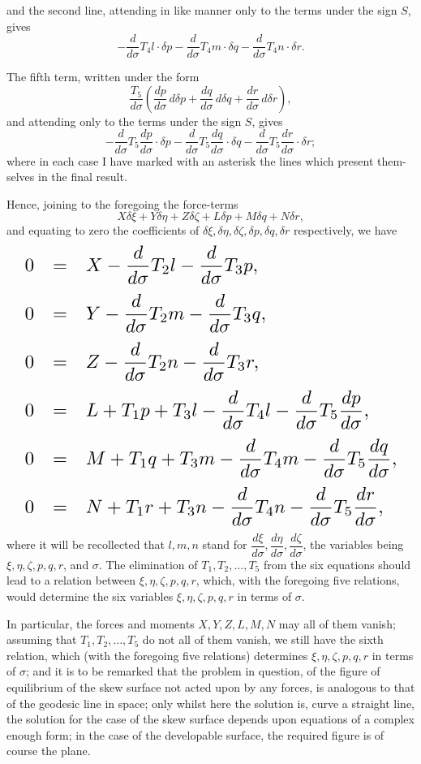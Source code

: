 \documentclass[11pt]{article}
\begin{document}
and the second line, attending in like manner only to the terms under the sign $S$,
gives
\[
-\frac{d}{d\sigma}T_4 l\cdot\delta p - \frac{d}{d\sigma}T_4 m\cdot\delta q - \frac{d}{d\sigma}T_4 n\cdot\delta r. \tag{*}
\]

The fifth term, written under the form
\[
\frac{T_5}{d\sigma}\left(\frac{dp}{d\sigma}\,d\delta p + \frac{dq}{d\sigma}\,d\delta q + \frac{dr}{d\sigma}\,d\delta r\right),
\]
and attending only to the terms under the sign $S$, gives
\[
-\frac{d}{d\sigma}T_5\frac{dp}{d\sigma}\cdot\delta p - \frac{d}{d\sigma}T_5\frac{dq}{d\sigma}\cdot\delta q - \frac{d}{d\sigma}T_5\frac{dr}{d\sigma}\cdot\delta r; \tag{*}
\]
where in each case I have marked with an asterisk the lines which present them-selves
in the final result.

Hence, joining to the foregoing the force-terms
\[
X\delta\xi + Y\delta\eta + Z\delta\zeta + L\delta p + M\delta q + N\delta r, \tag{*}
\]
and equating to zero the coefficients of $\delta\xi, \delta\eta, \delta\zeta, \delta p, \delta q, \delta r$ respectively, we have
\[
\resizebox{\textwidth}{!}{$\displaystyle
\begin{array}{rcl}
0 &=& X - \dfrac{d}{d\sigma}T_2 l - \dfrac{d}{d\sigma}T_3 p, \\[2ex]
0 &=& Y - \dfrac{d}{d\sigma}T_2 m - \dfrac{d}{d\sigma}T_3 q, \\[2ex]
0 &=& Z - \dfrac{d}{d\sigma}T_2 n - \dfrac{d}{d\sigma}T_3 r, \\[2ex]
0 &=& L + T_1 p + T_3 l - \dfrac{d}{d\sigma}T_4 l - \dfrac{d}{d\sigma}T_5\dfrac{dp}{d\sigma}, \\[2ex]
0 &=& M + T_1 q + T_3 m - \dfrac{d}{d\sigma}T_4 m - \dfrac{d}{d\sigma}T_5\dfrac{dq}{d\sigma}, \\[2ex]
0 &=& N + T_1 r + T_3 n - \dfrac{d}{d\sigma}T_4 n - \dfrac{d}{d\sigma}T_5\dfrac{dr}{d\sigma},
\end{array}$}
\]
where it will be recollected that $l, m, n$ stand for $\dfrac{d\xi}{d\sigma}, \dfrac{d\eta}{d\sigma}, \dfrac{d\zeta}{d\sigma}$, the variables being
$\xi, \eta, \zeta, p, q, r$, and $\sigma$. The elimination of $T_1, T_2, \ldots, T_5$ from the six equations
should lead to a relation between $\xi, \eta, \zeta, p, q, r$, which, with the foregoing five
relations, would determine the six variables $\xi, \eta, \zeta, p, q, r$ in terms of $\sigma$.

In particular, the forces and moments $X, Y, Z, L, M, N$ may all of them
vanish; assuming that $T_1, T_2, \ldots, T_5$ do not all of them vanish, we still have the
sixth relation, which (with the foregoing five relations) determines $\xi, \eta, \zeta, p, q, r$ in
terms of $\sigma$; and it is to be remarked that the problem in question, of the figure
of equilibrium of the skew surface not acted upon by any forces, is analogous to
that of the geodesic line in space; only whilst here the solution is, curve a straight
line, the solution for the case of the skew surface depends upon equations of a
complex enough form; in the case of the developable surface, the required figure is
of course the plane.
\end{document}
